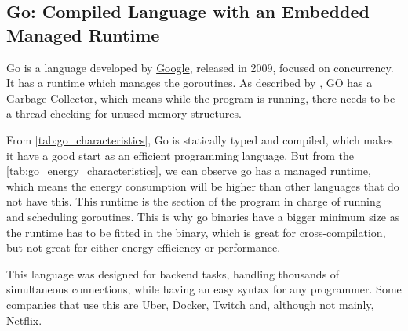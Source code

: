 \subsection{Go: Compiled Language with an Embedded Managed Runtime}

Go is a language developed by \href{https://google.com}{Google}, released in 2009, focused on concurrency. It has a runtime which manages the \gls{goroutines}. As described by \cite{rosecrance2019garbage}, GO has a Garbage Collector, which means while the program is running, there needs to be a thread checking for unused memory structures. 

From \autoref{tab:go_characteristics}, Go is statically typed and compiled, which makes it have a good start as an efficient programming language. But from the \autoref{tab:go_energy_characteristics}, we can observe go has a managed runtime, which means the energy consumption will be higher than other languages that do not have this. This runtime is the section of the program in charge of running and scheduling \gls{goroutines}. This is why go binaries have a bigger minimum size as the runtime has to be fitted in the binary, which is great for \gls{cross-compilation}, but not great for either energy efficiency or performance.

This language was designed for backend tasks, handling thousands of simultaneous connections, while having an easy syntax for any programmer. Some companies that use this are Uber, Docker, Twitch and, although not mainly, Netflix.  %



